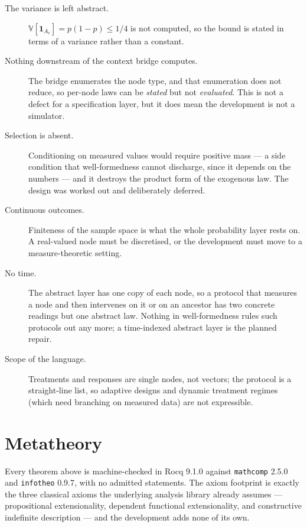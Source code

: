 \documentclass[11pt,a4paper]{article}
\theoremstyle{definition}
\theoremstyle{plain}
\theoremstyle{remark}
\newcommand{\Ind}[1]{\mathbf{1}_{#1}}
\newcommand{\Var}{\mathbb{V}}
\begin{document}
\begin{description}
\item[The variance is left abstract.] $\Var[\Ind{A_v}] = p(1-p) \le 1/4$ is
  not computed, so the bound is stated in terms of a variance rather than
  a constant.

\item[Nothing downstream of the context bridge computes.] The bridge
  enumerates the node type, and that enumeration does not reduce, so
  per-node laws can be \emph{stated} but not \emph{evaluated}. This is not
  a defect for a specification layer, but it does mean the development is
  not a simulator.

\item[Selection is absent.] Conditioning on measured values would require
  positive mass --- a side condition that well-formedness cannot discharge,
  since it depends on the numbers --- and it destroys the product form of
  the exogenous law. The design was worked out and deliberately deferred.

\item[Continuous outcomes.] Finiteness of the sample space is what the
  whole probability layer rests on. A real-valued node must be discretised,
  or the development must move to a measure-theoretic setting.

\item[No time.] The abstract layer has one copy of each node, so a protocol
  that measures a node and then intervenes on it or on an ancestor has two
  concrete readings but one abstract law. Nothing in well-formedness rules
  such protocols out any more; a time-indexed abstract layer is the planned
  repair.

\item[Scope of the language.] Treatments and responses are single nodes,
  not vectors; the protocol is a straight-line list, so adaptive designs
  and dynamic treatment regimes (which need branching on measured data)
  are not expressible.
\end{description}

\section{Metatheory}

Every theorem above is machine-checked in Rocq 9.1.0 against
\texttt{mathcomp} 2.5.0 and \texttt{infotheo} 0.9.7, with no admitted
statements. The axiom footprint is exactly the three classical axioms the
underlying analysis library already assumes --- propositional
extensionality, dependent functional extensionality, and constructive
indefinite description --- and the development adds none of its own.
\end{document}
